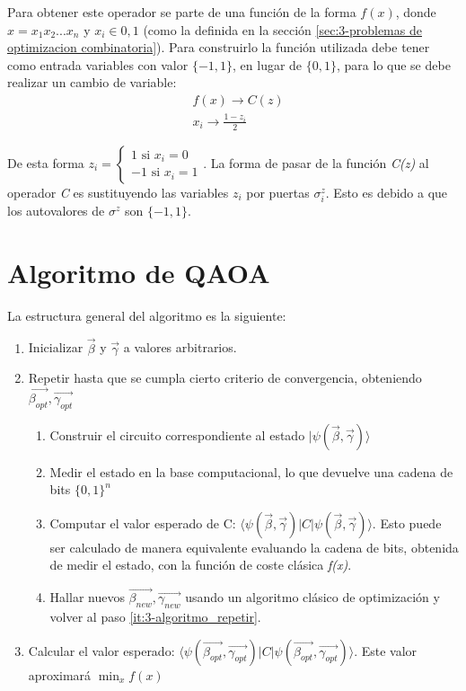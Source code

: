 \documentclass{article}
\begin{document}
Para obtener este operador se parte de una función de la forma \(f(x)\), donde \(x=x_1x_2...x_n\) y \(x_i\in{0, 1}\) (como la definida en la sección \ref{sec:3-problemas de optimizacion combinatoria}). Para construirlo la función utilizada debe tener como entrada variables con valor \(\{-1, 1\}\), en lugar de \(\{0, 1\}\), para lo que se debe realizar un cambio de variable:
\begin{align*}
  &f(x) \rightarrow C(z) \\
  &x_i \rightarrow \frac{1 - z_i}{2}
\end{align*}

De esta forma \(z_i = \begin{cases}
  1 \text{ si } x_i = 0 \\
  -1 \text{ si } x_i = 1
\end{cases}\).
La forma de pasar de la función \textit{C(z)} al operador \textit{C} es sustituyendo las variables \(z_i\) por puertas \(\sigma^z_i\). Esto es debido a que los autovalores de \(\sigma^z\) son $\{-1, 1\}$.  %

\section{Algoritmo de QAOA}
La estructura general del algoritmo es la siguiente:
\begin{enumerate}
\item Inicializar \(\vec{\beta}\) y \(\vec{\gamma}\) a valores arbitrarios.
\item Repetir hasta que se cumpla cierto criterio de convergencia, obteniendo \(\vec{\beta_{opt}}, \vec{\gamma_{opt}}\)
  \label{it:3-algoritmo_repetir}
  \begin{enumerate}
  \item Construir el circuito correspondiente al estado \(\lvert\psi(\vec{\beta}, \vec{\gamma})\rangle\)
  \item Medir el estado en la base computacional, lo que devuelve una cadena de bits \(\{0, 1\}^n\)
  \item Computar el valor esperado de C: \( \langle \psi(\vec{\beta}, \vec{\gamma}) \rvert C \lvert \psi(\vec{\beta}, \vec{\gamma}) \rangle \).
    Esto puede ser calculado de manera equivalente evaluando la cadena de bits, obtenida de medir el estado, con la función de coste clásica \textit{f(x)}.
  \item Hallar nuevos \(\vec{\beta_{new}}, \vec{\gamma_{new}}\) usando un algoritmo clásico de optimización y volver al paso \ref{it:3-algoritmo_repetir}.
  \end{enumerate}
\item Calcular el valor esperado: \( \langle \psi(\vec{\beta_{opt}}, \vec{\gamma_{opt}}) \rvert C \lvert \psi(\vec{\beta_{opt}}, \vec{\gamma_{opt}}) \rangle \). Este valor aproximará \(\min_{x}f(x)\)
\end{enumerate}
\end{document}
